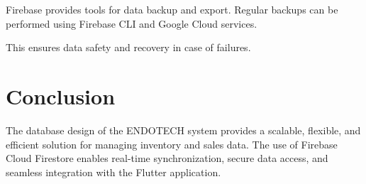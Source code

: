 Firebase provides tools for data backup and export. Regular backups can be performed using Firebase CLI and Google Cloud services.

This ensures data safety and recovery in case of failures.

\section{Conclusion}

The database design of the ENDOTECH system provides a scalable, flexible, and efficient solution for managing inventory and sales data. The use of Firebase Cloud Firestore enables real-time synchronization, secure data access, and seamless integration with the Flutter application.